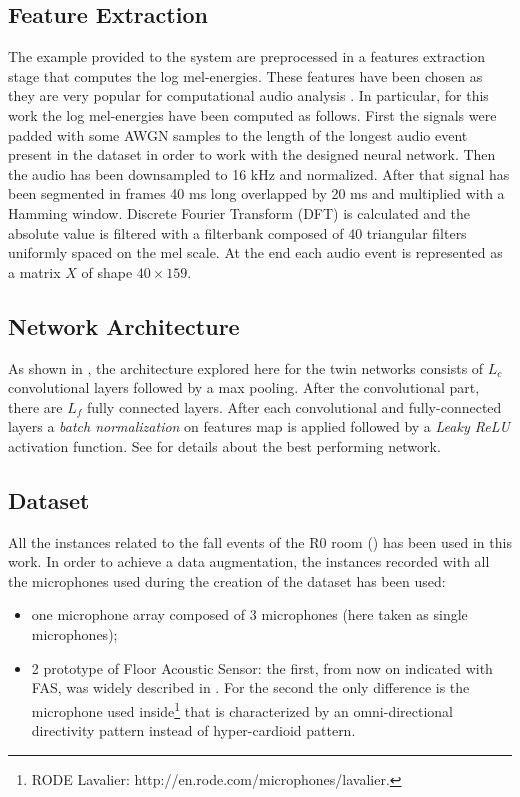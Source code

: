 \subsection{Feature Extraction}
The example provided to the system are preprocessed in a features extraction stage that computes the log mel-energies. These features have been chosen as they are very popular for computational audio analysis \cite{gemmeke2013exemplar,parascandolo2017convolutional,mesaros2010acoustic}.
In particular, for this work the log mel-energies have been computed as follows.
First the signals were padded with some AWGN samples to the length of the longest audio event present in the dataset in order to work with the designed neural network.
Then the audio has been downsampled to 16 kHz and normalized. After that signal has been segmented in frames 40 ms long overlapped
by 20 ms and multiplied with a Hamming window. Discrete Fourier Transform (DFT) is calculated and the absolute value is filtered with a filterbank composed of 40 triangular filters uniformly spaced on the mel scale. At the end each audio event is represented as a matrix $X$ of shape $40\times159$.  

\subsection{Network Architecture}
As shown in , the architecture explored here for the twin networks consists of $L_c$ convolutional layers followed by a max pooling. After the convolutional part, there are $L_f$ fully connected layers. After each convolutional and fully-connected layers a \textsl{batch normalization} on features map is applied followed by a \textsl{Leaky ReLU} activation function.
See  for details about the best performing network. 



\subsection{Dataset}
All the instances related to the fall events of the R0 room () has been used in this work. In order to achieve a data augmentation, the instances recorded with all the microphones used during the creation of the dataset has been used:
\begin{itemize}
	\item one microphone array composed of 3 microphones (here taken as single microphones);
	\item 2 prototype of Floor Acoustic Sensor: the first, from now on indicated with FAS, was widely described in . For the second the only difference is the microphone used inside\footnote{RODE Lavalier: http://en.rode.com/microphones/lavalier.} that is characterized by an omni-directional directivity pattern instead of hyper-cardioid pattern.
\end{itemize}

